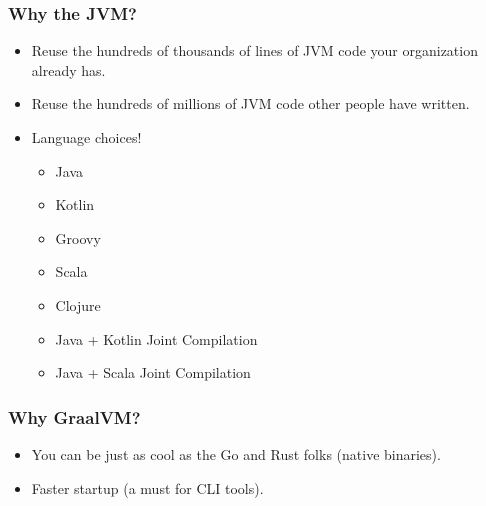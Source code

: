     \begin{frame}[label=lito]
        \frametitle{Why the JVM?}
        \begin{itemize}
            \item{Reuse the hundreds of thousands of lines of JVM code your organization already has.}
            \item<2->{Reuse the hundreds of millions of JVM code other people have written.}
            \item<3->{Language choices!\pause
               \begin{itemize}
                  \item<4->{Java}
                  \item<4->{Kotlin}
                  \item<4->{Groovy}
                  \item<4->{Scala}
                  \item<4->{Clojure}
                  \item<5->{Java + Kotlin Joint Compilation}
                  \item<5->{Java + Scala Joint Compilation}
               \end{itemize}
            }\pause

        \end{itemize}
    \end{frame}

    \begin{frame}[label=lito]
        \frametitle{Why GraalVM?}
        \begin{itemize}
            \item<1->{You can be just as cool as the Go and Rust folks (native binaries).}
            \item<2->{Faster startup (a must for CLI tools).}
        \end{itemize}
    \end{frame}

